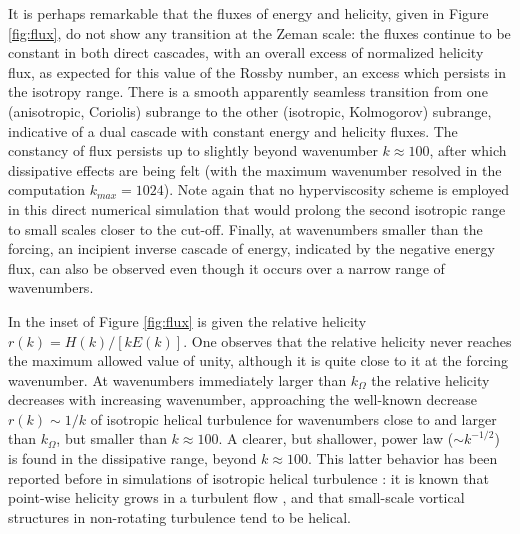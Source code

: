 \documentclass[aps,amsmath,amssymb,floatfix,showpacs]{revtex4}
\begin{document}
It is perhaps remarkable that the fluxes of energy and helicity, given in Figure \ref{fig:flux}, do not show any transition at the Zeman scale: the fluxes continue to be constant in both direct cascades, with an overall excess of normalized helicity flux, as expected for this value of the Rossby number, an excess which persists in the isotropy range. There is a  smooth apparently seamless transition from one (anisotropic, Coriolis) subrange to the other (isotropic, Kolmogorov) subrange, indicative of a dual cascade with constant energy and helicity fluxes. The constancy of flux persists up to slightly beyond  wavenumber $k\approx 100$, after which dissipative effects are being felt (with the maximum wavenumber resolved in the computation $k_{max}=1024$). Note again that no hyperviscosity scheme is employed in this direct numerical simulation that would prolong the second isotropic range to small scales closer to the cut-off. Finally, at wavenumbers smaller than the forcing, an incipient inverse cascade of energy, indicated by the negative energy flux, can also be observed {even though it occurs over a narrow range of wavenumbers}.  

In the inset of Figure \ref{fig:flux} is given the relative helicity $r(k)=H(k)/[kE(k)]$. One observes that the relative helicity never reaches the maximum allowed value of unity, although it is quite close to it at the forcing wavenumber. At wavenumbers immediately  {larger} than $k_\Omega$ the relative helicity decreases with increasing wavenumber, approaching the well-known decrease $r(k)\sim 1/k$ of isotropic helical turbulence for wavenumbers close to and larger than $k_\Omega$, but smaller than $k\approx 100$. A clearer, but shallower, power law ($\sim k^{-1/2}$) is found in the dissipative range, beyond $k\approx 100$. This latter behavior has been reported before in simulations of isotropic helical turbulence \citep{mininni08}: it is known that point-wise helicity grows in a turbulent flow \citep{matthaeus}, and that 
{small-scale vortical} structures in non-rotating turbulence tend to be helical.
\end{document}
